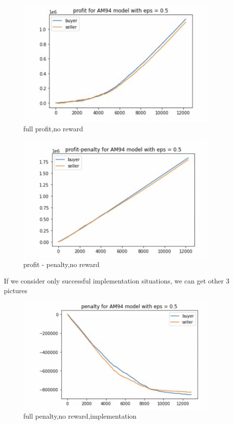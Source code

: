 \documentclass[11pt]{article}
\begin{document}
\begin{figure}[H]
	\begin{center}
	\includegraphics[width=0.9\textwidth]{20.PNG}
	\end{center}
	\caption{full profit,no reward}
	\label{FIG.20}
\end{figure}

\begin{figure}[H]
	\begin{center}
	\includegraphics[width=0.9\textwidth]{21.PNG}
	\end{center}
	\caption{profit - penalty,no reward}
	\label{FIG.21}
\end{figure}	

If we consider only successful implementation situations, we can get other 3 pictures

\begin{figure}[H]
	\begin{center}
	\includegraphics[width=0.9\textwidth]{22.PNG}
	\end{center}
	\caption{full penalty,no reward,implementation}
	\label{FIG.22}
\end{figure}
\end{document}
